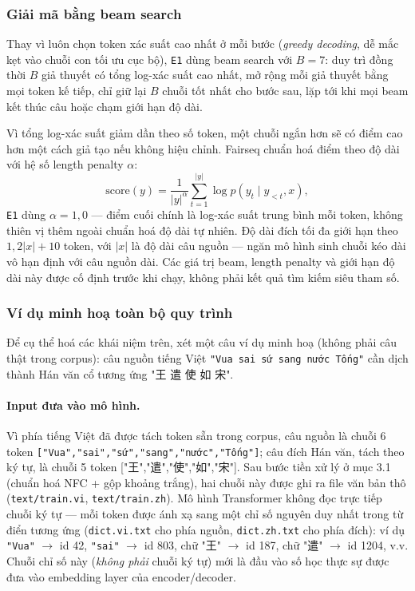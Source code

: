 \subsubsection{Giải mã bằng beam search}

Thay vì luôn chọn token xác suất cao nhất ở mỗi bước (\textit{greedy decoding}, dễ mắc
kẹt vào chuỗi con tối ưu cục bộ), \texttt{E1} dùng beam search với $B=7$: duy trì đồng
thời $B$ giả thuyết có tổng log-xác suất cao nhất, mở rộng mỗi giả thuyết bằng mọi token
kế tiếp, chỉ giữ lại $B$ chuỗi tốt nhất cho bước sau, lặp tới khi mọi beam kết thúc câu
hoặc chạm giới hạn độ dài.

Vì tổng log-xác suất giảm dần theo số token, một chuỗi ngắn hơn sẽ có điểm cao hơn một
cách giả tạo nếu không hiệu chỉnh. Fairseq chuẩn hoá điểm theo độ dài với hệ số length
penalty $\alpha$:
\begin{equation}
  \mathrm{score}(y) = \frac{1}{|y|^{\alpha}}\sum_{t=1}^{|y|}\log p(y_t\mid y_{<t},x),
  \label{eq:e1-beam-score}
\end{equation}
\texttt{E1} dùng $\alpha=1{,}0$ — điểm cuối chính là log-xác suất trung bình mỗi token,
không thiên vị thêm ngoài chuẩn hoá độ dài tự nhiên. Độ dài đích tối đa giới hạn theo
$1{,}2|x|+10$ token, với $|x|$ là độ dài câu nguồn — ngăn mô hình sinh chuỗi kéo dài vô
hạn định với câu nguồn dài. Các giá trị beam, length penalty và giới hạn độ dài này được
cố định trước khi chạy, không phải kết quả tìm kiếm siêu tham số.


\subsubsection{Ví dụ minh hoạ toàn bộ quy trình}

Để cụ thể hoá các khái niệm trên, xét một câu ví dụ minh hoạ (không phải câu thật trong
corpus): câu nguồn tiếng Việt \texttt{"Vua sai sứ sang nước Tống"} cần dịch thành Hán
văn cổ tương ứng "王 遣 使 如 宋".

\paragraph{Input đưa vào mô hình.} Vì phía tiếng Việt đã được tách token sẵn trong
corpus, câu nguồn là chuỗi 6 token \texttt{["Vua","sai","sứ","sang","nước","Tống"]};
câu đích Hán văn, tách theo ký tự, là chuỗi 5 token ["王","遣","使","如","宋"]. Sau bước
tiền xử lý ở mục 3.1 (chuẩn hoá NFC + gộp khoảng trắng), hai chuỗi này được ghi ra file
văn bản thô (\texttt{text/train.vi}, \texttt{text/train.zh}). Mô hình Transformer không
đọc trực tiếp chuỗi ký tự — mỗi token được ánh xạ sang một chỉ số nguyên duy nhất trong
từ điển tương ứng (\texttt{dict.vi.txt} cho phía nguồn, \texttt{dict.zh.txt} cho phía
đích): ví dụ \texttt{"Vua"} $\to$ id 42, \texttt{"sai"} $\to$ id 803, chữ "王" $\to$ id
187, chữ "遣" $\to$ id 1204, v.v. Chuỗi chỉ số này (\emph{không phải} chuỗi ký tự) mới là
đầu vào số học thực sự được đưa vào embedding layer của encoder/decoder.

